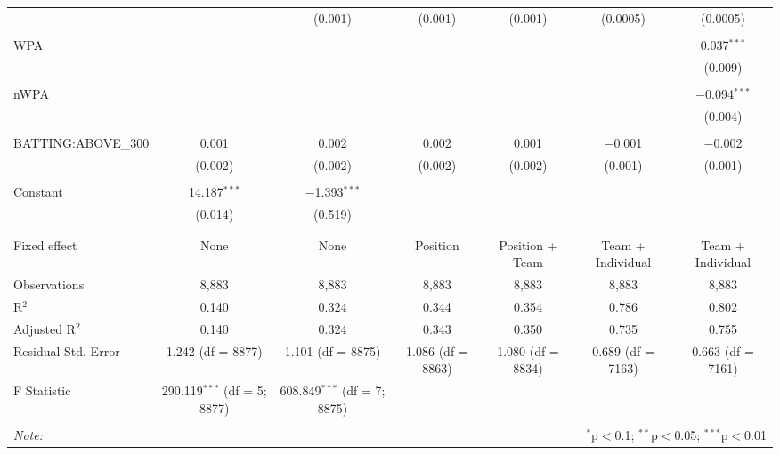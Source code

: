 \begin{table}[!htbp]
\begin{tabular}{@{\extracolsep{5pt}}lcccccc}
  &  & (0.001) & (0.001) & (0.001) & (0.0005) & (0.0005) \\
  & & & & & & \\
 WPA &  &  &  &  &  & 0.037$^{***}$ \\
  &  &  &  &  &  & (0.009) \\
  & & & & & & \\
 nWPA &  &  &  &  &  & $-$0.094$^{***}$ \\
  &  &  &  &  &  & (0.004) \\
  & & & & & & \\
 BATTING:ABOVE\_300 & 0.001 & 0.002 & 0.002 & 0.001 & $-$0.001 & $-$0.002 \\
  & (0.002) & (0.002) & (0.002) & (0.002) & (0.001) & (0.001) \\
  & & & & & & \\
 Constant & 14.187$^{***}$ & $-$1.393$^{***}$ &  &  &  &  \\
  & (0.014) & (0.519) &  &  &  &  \\
  & & & & & & \\
\hline \\[-1.8ex]
Fixed effect & None & None & Position & Position + Team & Team + Individual & Team + Individual \\
Observations & 8,883 & 8,883 & 8,883 & 8,883 & 8,883 & 8,883 \\
R$^{2}$ & 0.140 & 0.324 & 0.344 & 0.354 & 0.786 & 0.802 \\
Adjusted R$^{2}$ & 0.140 & 0.324 & 0.343 & 0.350 & 0.735 & 0.755 \\
Residual Std. Error & 1.242 (df = 8877) & 1.101 (df = 8875) & 1.086 (df = 8863) & 1.080 (df = 8834) & 0.689 (df = 7163) & 0.663 (df = 7161) \\
F Statistic & 290.119$^{***}$ (df = 5; 8877) & 608.849$^{***}$ (df = 7; 8875) &  &  &  &  \\
\hline
\hline \\[-1.8ex]
\textit{Note:}  & \multicolumn{6}{r}{$^{*}$p$<$0.1; $^{**}$p$<$0.05; $^{***}$p$<$0.01} \\
\end{tabular}
\end{table}
